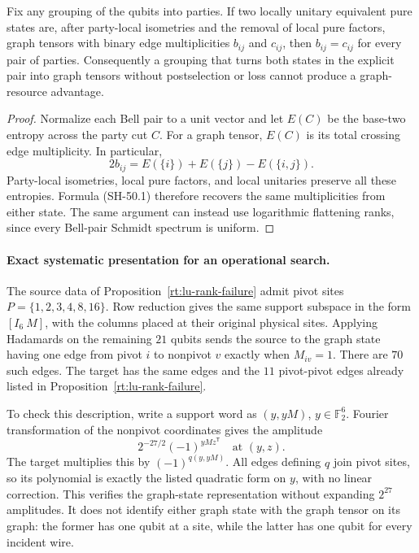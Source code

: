 \begin{lemma}
\label{lem:lu-graph-grouping}
Fix any grouping of the qubits into parties.  If two locally
unitary equivalent pure states are, after party-local isometries
and the removal of local pure factors, graph tensors with binary
edge multiplicities $b_{ij}$ and $c_{ij}$, then $b_{ij}=c_{ij}$
for every pair of parties.  Consequently a grouping that turns
both states in the explicit pair into graph tensors without
postselection or loss cannot produce a graph-resource advantage.
\end{lemma}
\begin{proof}
Normalize each Bell pair to a unit vector and let $E(C)$ be
the base-two entropy across the party cut $C$.  For a graph tensor,
$E(C)$ is its total crossing edge multiplicity.  In particular,
\[
 2b_{ij}=E(\{i\})+E(\{j\})-E(\{i,j\}).              \tag{SH-50.1}
\]
Party-local isometries, local pure factors, and local unitaries
preserve all these entropies.  Formula (SH-50.1) therefore
recovers the same multiplicities from either state.  The same
argument can instead use logarithmic flattening ranks, since
every Bell-pair Schmidt spectrum is uniform.
\end{proof}

\paragraph{Exact systematic presentation for an operational search.}
The source data of Proposition~\ref{rt:lu-rank-failure} admit
pivot sites $P=\{1,2,3,4,8,16\}$.  Row reduction gives
the same support subspace in the form $[I_6\ M]$, with the
columns placed at their original physical sites.  Applying
Hadamards on the remaining $21$ qubits sends the source to
the graph state having one edge from pivot $i$ to nonpivot $v$
exactly when $M_{iv}=1$.  There are $70$ such edges.  The target
has the same edges and the $11$ pivot-pivot edges already listed
in Proposition~\ref{rt:lu-rank-failure}.

To check this description, write a support word as
$(y,yM)$, $y\in\mathbb F_2^6$.  Fourier transformation of the
nonpivot coordinates gives the amplitude
\[
 2^{-27/2}(-1)^{yMz^{\mathsf T}}
 \quad\text{at }(y,z).
\]
The target multiplies this by $(-1)^{q(y,yM)}$.
All edges defining $q$ join pivot sites, so its polynomial is
exactly the listed quadratic form on $y$, with no linear
correction.  This verifies the graph-state representation
without expanding $2^{27}$ amplitudes.  It does not identify
either graph state with the graph tensor on its graph: the
former has one qubit at a site, while the latter has one qubit
for every incident wire.

